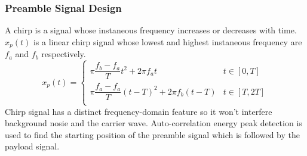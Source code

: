 \subsubsection{Preamble Signal Design}
A chirp is a signal whose instaneous frequency increases or decreases with time.
$x_p(t)$ is a linear chirp signal whose lowest and highest instaneous frequency are $f_a$ and $f_b$ respectively.
\[
  x_p(t) = \begin{cases}
    \pi \dfrac{f_b-f_a}{T} t^2       + 2\pi f_a t     & t\in [0,T]  \\
    \pi \dfrac{f_a-f_a}{T} {(t-T)}^2 + 2\pi f_b (t-T) & t\in [T,2T] \\
  \end{cases}
\]
Chirp signal has a distinct frequency-domain feature so it won't interfere background nosie and the carrier wave.
Auto-correlation energy peak detection is used to find the starting position of the preamble signal which is followed by the payload signal.

